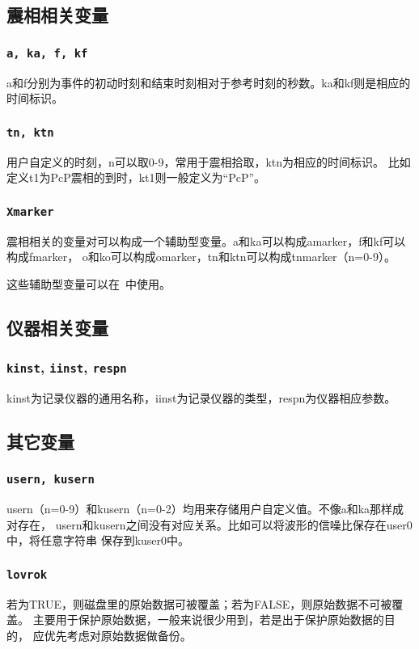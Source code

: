 \subsection{震相相关变量}
\subsubsection{\texttt{a, ka, f, kf}}
a和f分别为事件的初动时刻和结束时刻相对于参考时刻的秒数。ka和kf则是相应的时间标识。

\subsubsection{\texttt{tn, ktn}}
用户自定义的时刻，n可以取0-9，常用于震相拾取，ktn为相应的时间标识。
比如定义t1为PcP震相的到时，kt1则一般定义为``PcP''。

\subsubsection{\texttt{Xmarker}}
震相相关的变量对可以构成一个辅助型变量。a和ka可以构成amarker，f和kf可以构成fmarker，
o和ko可以构成omarker，tn和ktn可以构成tnmarker（n=0-9）。

这些辅助型变量可以在~中使用。

\subsection{仪器相关变量}
\subsubsection{\texttt{kinst}, \texttt{iinst}\dag, \texttt{respn}\dag}
kinst为记录仪器的通用名称，iinst为记录仪器的类型，respn为仪器相应参数。

\subsection{其它变量}
\subsubsection{\texttt{usern, kusern}}
usern（n=0-9）和kusern（n=0-2）均用来存储用户自定义值。不像a和ka那样成对存在，
usern和kusern之间没有对应关系。比如可以将波形的信噪比保存在user0中，将任意字符串
保存到kuser0中。

\subsubsection{\texttt{lovrok}}
若为TRUE，则磁盘里的原始数据可被覆盖；若为FALSE，则原始数据不可被覆盖。
主要用于保护原始数据，一般来说很少用到，若是出于保护原始数据的目的，
应优先考虑对原始数据做备份。

